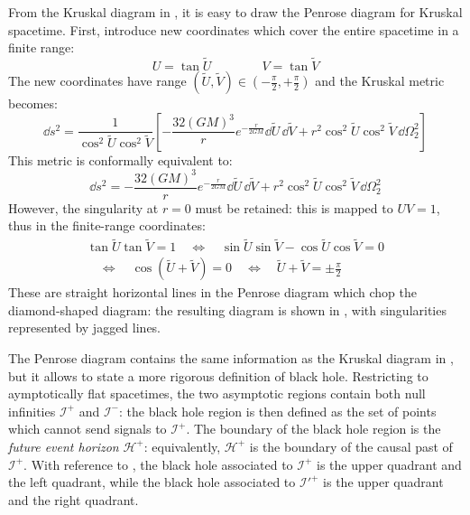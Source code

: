 From the Kruskal diagram in , it is easy to draw the Penrose diagram for Kruskal spacetime.
First, introduce new coordinates which cover the entire spacetime in a finite range:
\begin{equation*}
  U = \tan \tilde{U}
  \qquad \qquad
  V = \tan \tilde{V}
\end{equation*}
The new coordinates have range $ (\tilde{U},\tilde{V}) \in (-\frac{\pi}{2}, + \frac{\pi}{2}) $ and the Kruskal metric becomes:
\begin{equation*}
  \dd s^2 = \frac{1}{\cos^2 \tilde{U} \cos^2 \tilde{V}} \left[ - \frac{32 (GM)^3}{r} e^{-\frac{r}{2GM}} \dd \tilde{U}\,\dd \tilde{V} + r^2 \cos^2 \tilde{U} \cos^2 \tilde{V} \, \dd \Omega_2^2 \right]
\end{equation*}
This metric is conformally equivalent to:
\begin{equation*}
  \dd s^2 = - \frac{32 (GM)^3}{r} e^{-\frac{r}{2GM}} \dd \tilde{U}\,\dd \tilde{V} + r^2 \cos^2 \tilde{U} \cos^2 \tilde{V} \, \dd \Omega_2^2
\end{equation*}
However, the singularity at $ r = 0 $ must be retained: this is mapped to $ UV = 1 $, thus in the finite-range coordinates:
\begin{multline*}
  \tan \tilde{U} \tan \tilde{V} = 1
  \quad \iff \quad
  \sin \tilde{U} \sin \tilde{V} - \cos \tilde{U} \cos \tilde{V} = 0 \\
  \quad \iff \quad
  \cos (\tilde{U} + \tilde{V}) = 0
  \quad \iff \quad
  \tilde{U} + \tilde{V} = \pm \frac{\pi}{2}
\end{multline*}
These are straight horizontal lines in the Penrose diagram which chop the diamond-shaped diagram: the resulting diagram is shown in , with singularities represented by jagged lines.

The Penrose diagram contains the same information as the Kruskal diagram in , but it allows to state a more rigorous definition of black hole. Restricting to aymptotically flat spacetimes, the two asymptotic regions contain both null infinities $ \mathcal{I}^+ $ and $ \mathcal{I}^- $: the black hole region is then defined as the set of points which cannot send signals to $ \mathcal{I}^+ $. The boundary of the black hole region is the \textit{future event horizon} $ \mathcal{H}^+ $: equivalently, $ \mathcal{H}^+ $ is the boundary of the causal past of $ \mathcal{I}^+ $. With reference to , the black hole associated to $ \mathcal{I}^+ $ is the upper quadrant and the left quadrant, while the black hole associated to $ \mathcal{I}'^{+} $ is the upper quadrant and the right quadrant.

